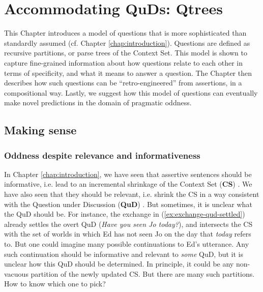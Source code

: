 \chapter{Accommodating QuDs: Qtrees}\label{chap:accommodating-quds}

This Chapter introduces a model of questions that is more sophisticated than standardly assumed (cf. Chapter \ref{chap:introduction}). Questions are defined as recursive partitions, or parse trees of the Context Set. This model is shown to capture fine-grained information about how questions relate to each other in terms of specificity, and what it means to answer a question. The Chapter then describes how such questions can be ``retro-engineered'' from assertions, in a compositional way. Lastly, we suggest how this model of questions can eventually make novel predictions in the domain of pragmatic oddness. 


\section{Making sense}

\subsection{Oddness despite relevance and informativeness}
In Chapter \ref{chap:introduction}, we have seen that assertive sentences should be informative, i.e. lead to an incremental shrinkage of the Context Set (\textbf{CS}) \citep{Stalnaker1978,Heim1982}. We have also seen that they should be relevant, i.e. shrink the CS in a way consistent with the Question under Discussion (\textbf{QuD}) \citep{Lewis1988,Roberts2012}. But sometimes, it is unclear what the QuD should be. For instance, the exchange in (\ref{ex:exchange-qud-settled}) already settles the overt QuD (\textit{Have you seen Jo today?}), and intersects the CS with the set of worlds in which Ed has not seen Jo on the day that \textit{today} refers to. But one could imagine many possible continuations to Ed's utterance. Any such continuation should be informative and relevant to \textit{some} QuD, but it is unclear how this QuD should be determined. In principle, it could be any non-vacuous partition of the newly updated CS. But there are many such partitions. How to know which one to pick?

\begin{exe}
	\label{ex:exchange-qud-settled}
\end{exe}

